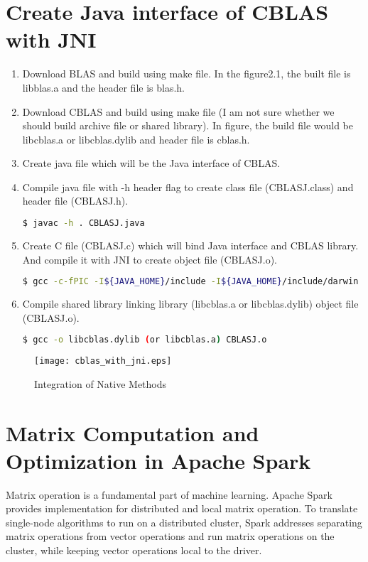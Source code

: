 \section{Create Java interface of CBLAS with JNI}
\label{sec:history}
\begin{enumerate}
    \item Download BLAS and build using make file. In the figure2.1, the built file is libblas.a and the header file is blas.h.
    \item Download CBLAS and build using make file (I am not sure whether we should build archive file or shared library). In figure, the build file would be libcblas.a or libcblas.dylib and header file is cblas.h.
    \item Create java file which will be the Java interface of CBLAS.
    \item Compile java file with -h header flag to create class file (CBLASJ.class) and header file (CBLASJ.h).
\begin{lstlisting}[language=bash]
    $ javac -h . CBLASJ.java
\end{lstlisting}
    \item Create C file (CBLASJ.c) which will bind Java interface and CBLAS library. And compile it with JNI to create object file (CBLASJ.o).
\begin{lstlisting}[language=bash]
    $ gcc -c-fPIC -I${JAVA_HOME}/include -I${JAVA_HOME}/include/darwin CBLASJ.c
\end{lstlisting}
    \item Compile shared library linking library (libcblas.a or libcblas.dylib) object file (CBLASJ.o).
\begin{lstlisting}[language=bash]
    $ gcc -o libcblas.dylib (or libcblas.a) CBLASJ.o 
\end{lstlisting}
\end{enumerate}

\begin{figure}[htb]
    \texttt{[image: cblas\_with\_jni.eps]}
    \caption{Integration of Native Methods }
    \label{fig:Sampling}
\end{figure}



\section{Matrix Computation and Optimization in Apache Spark}
\label{sec:history}

Matrix operation is a fundamental part of machine learning. Apache Spark provides implementation for distributed and local matrix operation. 
To translate single-node algorithms to run on a distributed cluster, Spark addresses separating matrix operations from vector operations and run matrix operations on the cluster, 
while keeping vector operations local to the driver. 

